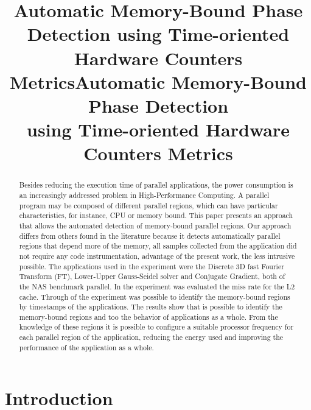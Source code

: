 \documentclass[conference,letter,10pt,final]{IEEEtran}
\date{}
\title{Automatic Memory-Bound Phase Detection using Time-oriented Hardware Counters Metrics}
\begin{document}
\title{Automatic Memory-Bound Phase Detection \\ using Time-oriented Hardware Counters Metrics}

\author{
}

\maketitle

\begin{abstract}
Besides reducing the execution time of parallel applications, the power
consumption is an increasingly addressed problem in High-Performance
Computing. A parallel program may be composed of different
parallel regions, which can have particular characteristics, for instance,
CPU or memory bound. This paper presents an
approach that allows the automated detection of memory-bound parallel
regions. Our approach differs from others found in the literature
because it detects automatically parallel regions that depend more
of the memory, all samples collected from the application did not require
any code instrumentation, advantage of the present work, the
less intrusive possible. The applications used in the experiment
were the Discrete 3D fast Fourier Transform (FT), Lower-Upper
Gauss-Seidel solver and Conjugate Gradient, both of the NAS benchmark
parallel. In the experiment was evaluated the miss rate for the L2
cache. Through of the experiment was possible to identify the memory-bound
regions by timestamps of the applications. The results show that is
possible to identify the memory-bound regions and too the behavior of
applications as a whole. From the knowledge of these regions it is
possible to configure a suitable processor frequency for each parallel
region of the application, reducing the energy used and improving the
performance of the application as a whole. 
\end{abstract}

\section{Introduction}
\label{sec:orgheadline1}

\end{document}
